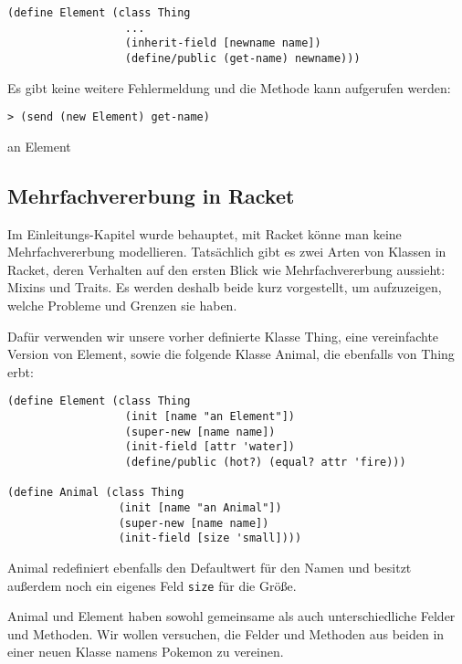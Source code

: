 \begin{lstlisting}
(define Element (class Thing 
                  ...
                  (inherit-field [newname name])
                  (define/public (get-name) newname)))
\end{lstlisting}

Es gibt keine weitere Fehlermeldung und die Methode kann aufgerufen werden:

\begin{lstlisting}
> (send (new Element) get-name)
\end{lstlisting}
{\routput {\qq}an Element\qq}

\subsection{Mehrfachvererbung in Racket}
\label{mixins}
Im Einleitungs-Kapitel wurde behauptet, mit Racket könne man keine Mehrfachvererbung modellieren. Tatsächlich gibt es zwei Arten von Klassen in Racket, deren Verhalten auf den ersten Blick wie Mehrfachvererbung aussieht: Mixins und Traits. Es werden deshalb beide kurz vorgestellt, um aufzuzeigen, welche Probleme und Grenzen sie haben.

Dafür verwenden wir unsere vorher definierte Klasse Thing, eine vereinfachte Version von Element, sowie die folgende Klasse Animal, die ebenfalls von Thing erbt:

\begin{lstlisting}
(define Element (class Thing 
                  (init [name "an Element"])
                  (super-new [name name])
                  (init-field [attr 'water])
                  (define/public (hot?) (equal? attr 'fire)))

(define Animal (class Thing
                 (init [name "an Animal"])
                 (super-new [name name])
                 (init-field [size 'small])))
\end{lstlisting}

Animal redefiniert ebenfalls den Defaultwert für den Namen und besitzt außerdem noch ein eigenes Feld \texttt{size} für die Größe.

Animal und Element haben sowohl gemeinsame als auch unterschiedliche Felder und Methoden. Wir wollen versuchen, die Felder und Methoden aus beiden in einer neuen Klasse namens Pokemon zu vereinen. 



